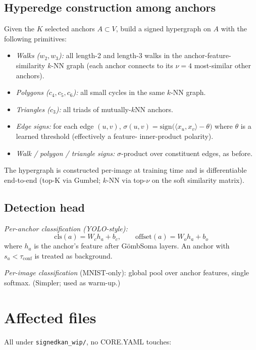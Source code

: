 \documentclass[11pt,a4paper]{article}
\newcommand{\sig}{\ensuremath{\sigma}}
\newcommand{\Soma}{G\"ombSoma}
\begin{document}
\subsection{Hyperedge construction among anchors}

Given the $K$ selected anchors $A \subset V$, build a signed
hypergraph on $A$ with the following primitives:

\begin{itemize}
\item \emph{Walks ($w_2, w_3$):} all length-2 and length-3 walks in
  the anchor-feature-similarity $k$-NN graph (each anchor connects
  to its $\nu = 4$ most-similar other anchors).
\item \emph{Polygons ($c_4, c_5, c_6$):} all small cycles in the
  same $k$-NN graph.
\item \emph{Triangles ($c_3$):} all triads of mutually-$k$NN anchors.
\item \emph{Edge signs:} for each edge $(u, v)$,
  $\sig(u, v) = \text{sign}\bigl( \langle x_u, x_v \rangle - \theta \bigr)$
  where $\theta$ is a learned threshold (effectively a feature-
  inner-product polarity).
\item \emph{Walk / polygon / triangle signs:} $\sig$-product over
  constituent edges, as before.
\end{itemize}

The hypergraph is constructed per-image at training time and
is differentiable end-to-end (top-K via Gumbel; $k$-NN via
top-$\nu$ on the soft similarity matrix).

\subsection{Detection head}

\emph{Per-anchor classification (YOLO-style):}
\[
\text{cls}(a) = W_c h_a + b_c, \qquad
\text{offset}(a) = W_o h_a + b_o
\]
where $h_a$ is the anchor's feature after \Soma{} layers. An
anchor with $s_a < \tau_\text{conf}$ is treated as background.

\emph{Per-image classification} (MNIST-only): global pool over
anchor features, single softmax. (Simpler; used as warm-up.)

\section{Affected files}

All under \texttt{signedkan\_wip/}, no CORE.YAML touches:
\end{document}
